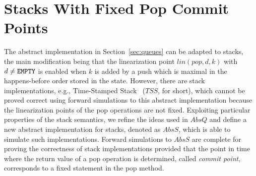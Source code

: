 \vspace{-3.5mm}
\section{Stacks With Fixed Pop Commit Points}\label{sec:stacks}
\vspace{-1.5mm}
The abstract implementation in Section~\ref{sec:queues} can be adapted to stacks, the main modification being that the linearization point $lin(pop,d,k)$ with $d\neq{\tt EMPTY}$ is enabled when $k$ is added by a push which is maximal in the happens-before order stored in the state. However, there are stack implementations, e.g., Time-Stamped Stack~\cite{DBLP:conf/popl/DoddsHK15} ($\mathit{TSS}$, for short), which cannot be proved correct using forward simulations to this abstract implementation because the linearization points of the pop operations are not fixed.
Exploiting particular properties of the stack semantics, we refine the ideas used in $AbsQ$ and define 
a new abstract implementation for stacks, denoted as $AbsS$, which is able to simulate such implementations. Forward simulations to $AbsS$ are complete for proving the correctness of stack implementations provided that the point in time where the return value of a pop operation is determined, called \emph{commit point}, corresponds to a fixed statement in the pop method.

\vspace{-3.5mm}
